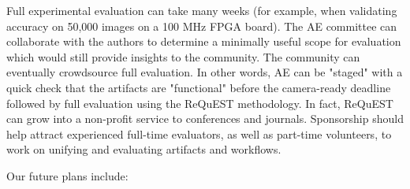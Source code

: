 \documentclass[10pt,onecolumn]{article}
\newenvironment{packed_itemize}{
\begin{itemize}
  \setlength{\itemsep}{1pt}
  \setlength{\parskip}{0pt}
  \setlength{\parsep}{0pt}
}{\end{itemize}}
\begin{document}
\begin{packed_itemize}
 \item

Full experimental evaluation can take many weeks (for example,
when validating accuracy on 50,000 images on a 100 MHz FPGA
board). The AE committee can collaborate with the authors
to determine a minimally useful scope for evaluation which
would still provide insights to the community. The community
can eventually crowdsource full evaluation. In other words,
AE can be "staged" with a quick check that the artifacts are
"functional" before the camera-ready deadline followed by full
evaluation using the ReQuEST methodology. In fact, ReQuEST can
grow into a non-profit service to conferences and journals.
Sponsorship should help attract experienced full-time
evaluators, as well as part-time volunteers, to work
on unifying and evaluating artifacts and workflows.

\end{packed_itemize}



Our future plans include:
\end{document}
